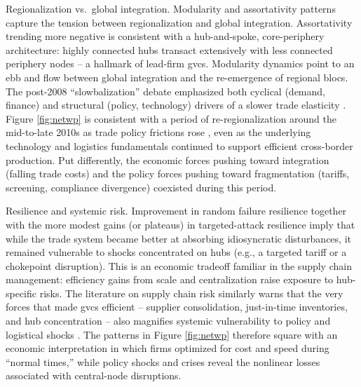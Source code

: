 \documentclass[preprint, 3p,
authoryear]{elsarticle} %
\begin{document}
Regionalization vs.~global integration. Modularity and assortativity
patterns capture the tension between regionalization and global
integration. Assortativity trending more negative is consistent with a
hub-and-spoke, core-periphery architecture: highly connected hubs
transact extensively with less connected periphery nodes -- a hallmark
of lead-firm \glspl{gvc}. Modularity dynamics point to an ebb and flow
between global integration and the re-emergence of regional blocs. The
post-2008 ``slowbalization'' debate emphasized both cyclical (demand,
finance) and structural (policy, technology) drivers of a slower trade
elasticity \citep{constantinescu2020global}. Figure \ref{fig:netwp} is
consistent with a period of re-regionalization around the mid-to-late
2010s as trade policy frictions rose \citep{evenett2019protectionism},
even as the underlying technology and logistics fundamentals continued
to support efficient cross-border production. Put differently, the
economic forces pushing toward integration (falling trade costs) and the
policy forces pushing toward fragmentation (tariffs, screening,
compliance divergence) coexisted during this period.

Resilience and systemic risk. Improvement in random failure resilience
together with the more modest gains (or plateaus) in targeted-attack
resilience imply that while the trade system became better at absorbing
idiosyncratic disturbances, it remained vulnerable to shocks
concentrated on hubs (e.g., a targeted tariff or a chokepoint
disruption). This is an economic tradeoff familiar in the supply chain
management: efficiency gains from scale and centralization raise
exposure to hub-specific risks. The literature on supply chain risk
similarly warns that the very forces that made \glspl{gvc} efficient --
supplier consolidation, just-in-time inventories, and hub concentration
-- also magnifies systemic vulnerability to policy and logistical shocks
\citep{baldwin2022risks}. The patterns in Figure \ref{fig:netwp}
therefore square with an economic interpretation in which firms
optimized for cost and speed during ``normal times,'' while policy
shocks and crises reveal the nonlinear losses associated with
central-node disruptions.
\end{document}
